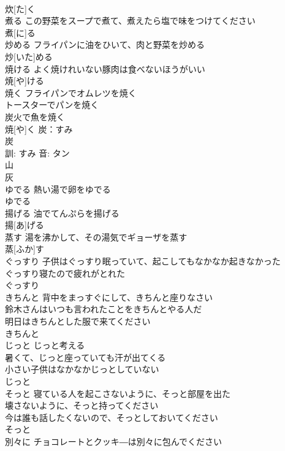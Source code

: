 \documentclass[8pt]{extreport}
\begin{document}
\begin{CJK}{UTF8}{min}
\\	炊[た]く						
\\	煮る	この野菜をスープで煮て、煮えたら塩で味をつけてください 
\\	煮[に]る						
\\	炒める	フライパンに油をひいて、肉と野菜を炒める 
\\	炒[いた]める			
\\	焼ける	よく焼けれいない豚肉は食べないほうがいい 
\\	焼[や]ける						
\\	焼く	フライパンでオムレツを焼く 
\\	トースターでパンを焼く 
\\	炭火で魚を焼く 
\\	焼[や]く			炭：すみ
\\	炭 
\\	訓: すみ 音: タン 
\\	山 
\\	灰 
\\	ゆでる	熱い湯で卵をゆでる 
\\	ゆでる						
\\	揚げる	油でてんぷらを揚げる 
\\	揚[あ]げる						
\\	蒸す	湯を沸かして、その湯気でギョーザを蒸す 
\\	蒸[ふか]す						
\\	ぐっすり	子供はぐっすり眠っていて、起こしてもなかなか起きなかった 
\\	ぐっすり寝たので疲れがとれた 
\\	ぐっすり			
\\	きちんと	背中をまっすぐにして、きちんと座りなさい 
\\	鈴木さんはいつも言われたことをきちんとやる人だ 
\\	明日はきちんとした服で来てください 
\\	きちんと			
\\	じっと	じっと考える 
\\	暑くて、じっと座っていても汗が出てくる 
\\	小さい子供はなかなかじっとしていない 
\\	じっと		
\\	そっと	寝ている人を起こさないように、そっと部屋を出た 
\\	壊さないように、そっと持ってください 
\\	今は誰も話したくないので、そっとしておいてください 
\\	そっと			
\\	別々に	チョコレートとクッキ―は別々に包んでください 

\end{CJK}
\end{document}
